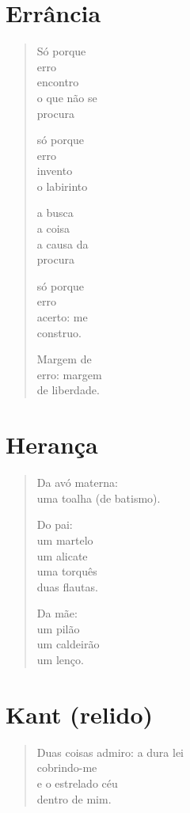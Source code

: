 \chapter{Errância}

\begin{verse}
Só porque\\
erro\\
encontro\\
o que não se\\
procura

só porque\\
erro\\
invento\\
o labirinto

a busca\\
a coisa\\
a causa da\\
procura

só porque\\
erro\\
acerto: me\\
construo.

Margem de\\
erro: margem\\
de liberdade.
\end{verse}

\chapter{Herança}

\begin{verse}
Da avó materna:\\
uma toalha (de batismo).

Do pai:\\
um martelo\\
um alicate\\
uma torquês\\
duas flautas.

Da mãe:\\
um pilão\\
um caldeirão\\
um lenço.
\end{verse}

\chapter{Kant (relido)}

\begin{verse}
Duas coisas admiro: a dura lei\\
cobrindo-me\\
e o estrelado céu\\
dentro de mim.
\end{verse}


